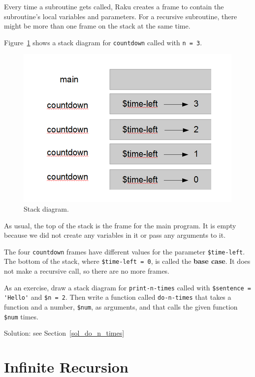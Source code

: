 Every time a subroutine gets called, Raku creates a
frame to contain the subroutine's local variables and parameters.
For a recursive subroutine, there might be more than one frame 
on the stack at the same time.

Figure~\ref{fig.stack2} shows a stack diagram for {\tt countdown} called with
{\tt n = 3}.

\begin{figure}
\centerline
{\includegraphics[scale=0.6]{figs/stack2.png}}
\caption{Stack diagram.}
\label{fig.stack2}
\end{figure}


As usual, the top of the stack is the frame for the main 
program.
It is empty because we did not create any variables in 
it or pass any arguments to it.

The four {\tt countdown} frames have different values for the
parameter {\tt \$time-left}.  The bottom of the stack, where {\tt \$time-left = 0}, is
called the {\bf base case}.  It does not make a recursive call, so
there are no more frames.

As an exercise, draw a stack diagram for \verb"print-n-times" 
called with
\verb"$sentence = 'Hello'" and {\tt \$n = 2}.
Then write a function called \verb"do-n-times" that takes a function
and a number, {\tt \$num}, as arguments, and that calls
the given function {\tt \$num} times.
\label{do_n_times}

Solution: see Section~\ref{sol_do_n_times}


\section{Infinite Recursion}


